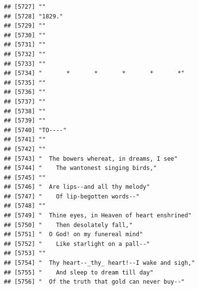 \documentclass{article}\usepackage[]{graphicx}\usepackage[]{color}
\makeatletter
\newenvironment{kframe}{%
 \def\at@end@of@kframe{}%
 \ifinner\ifhmode%
  \def\at@end@of@kframe{\end{minipage}}%
  \begin{minipage}{\columnwidth}%
 \fi\fi%
 \def\FrameCommand##1{\hskip\@totalleftmargin \hskip-\fboxsep
 \colorbox{shadecolor}{##1}\hskip-\fboxsep
     \hskip-\linewidth \hskip-\@totalleftmargin \hskip\columnwidth}%
 \MakeFramed {\advance\hsize-\width
   \@totalleftmargin\z@ \linewidth\hsize
   \@setminipage}}%
 {\par\unskip\endMakeFramed%
 \at@end@of@kframe}
\newenvironment{knitrout}{}{} %
\makeatother
\begin{document}
\begin{knitrout}
\begin{kframe}
\begin{verbatim}
## [5727] ""                                                                            
## [5728] "1829."                                                                       
## [5729] ""                                                                            
## [5730] ""                                                                            
## [5731] ""                                                                            
## [5732] ""                                                                            
## [5733] ""                                                                            
## [5734] "       *       *       *       *       *"                                    
## [5735] ""                                                                            
## [5736] ""                                                                            
## [5737] ""                                                                            
## [5738] ""                                                                            
## [5739] ""                                                                            
## [5740] "TO----"                                                                      
## [5741] ""                                                                            
## [5742] ""                                                                            
## [5743] "  The bowers whereat, in dreams, I see"                                      
## [5744] "    The wantonest singing birds,"                                            
## [5745] ""                                                                            
## [5746] "  Are lips--and all thy melody"                                              
## [5747] "    Of lip-begotten words--"                                                 
## [5748] ""                                                                            
## [5749] "  Thine eyes, in Heaven of heart enshrined"                                  
## [5750] "    Then desolately fall,"                                                   
## [5751] "  O God! on my funereal mind"                                                
## [5752] "    Like starlight on a pall--"                                              
## [5753] ""                                                                            
## [5754] "  Thy heart--_thy_ heart!--I wake and sigh,"                                 
## [5755] "    And sleep to dream till day"                                             
## [5756] "  Of the truth that gold can never buy--"                                    

\end{verbatim}
\end{kframe}
\end{knitrout}
\end{document}
